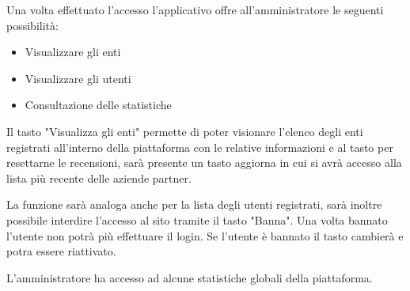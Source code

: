 \begin{center}
\end{center}
Una volta effettuato l'accesso l'applicativo offre all'amministratore le seguenti possibilità:
\begin{itemize}
    \item Visualizzare gli enti
    \item Visualizzare gli utenti
    \item Consultazione delle statistiche
\end{itemize}
\begin{center}
\end{center}
Il tasto "Visualizza gli enti" permette di poter visionare l'elenco degli enti registrati all'interno della piattaforma con le relative informazioni e al tasto per resettarne le recensioni, sarà presente un tasto aggiorna in cui si avrà accesso alla lista più recente delle aziende partner.
\begin{center}
\end{center}
La funzione sarà analoga anche per la lista degli utenti registrati, sarà inoltre possibile interdire l'accesso al sito tramite il tasto "Banna". Una volta bannato l'utente non potrà più effettuare il login. Se l'utente è bannato il tasto cambierà e potra essere riattivato.
\begin{center}
\end{center}
L'amministratore ha accesso ad alcune statistiche globali della piattaforma.